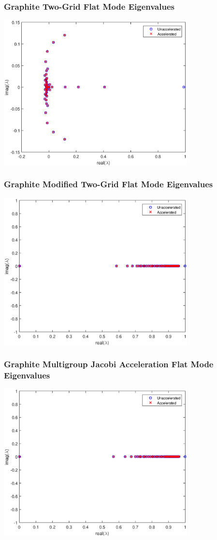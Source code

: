 \documentclass[compress,10pt]{beamer}
\begin{document}
\begin{frame}[t]
{
\frametitle{\small Graphite Two-Grid Flat Mode Eigenvalues}
\hspace*{1.1cm}
\includegraphics[width=0.75\textwidth]{images/IM1_Graph_FA_TG.eps}
}
{
\frametitle{\small Graphite Modified Two-Grid Flat Mode Eigenvalues}
\hspace*{1.1cm}
\includegraphics[width=0.75\textwidth]{images/IM1_Graph_FA_MTG.eps}
}
{
\frametitle{\small Graphite Multigroup Jacobi Acceleration Flat Mode Eigenvalues}
\hspace*{1.1cm}
\includegraphics[width=0.75\textwidth]{images/IM1_Graph_FA_MJA.eps}
}
\end{frame}
\end{document}
